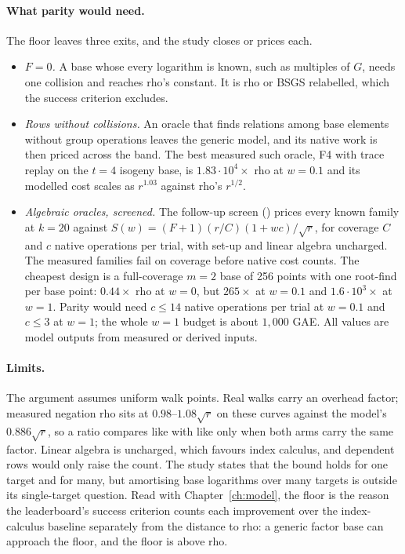 \paragraph{What parity would need.} The floor leaves three exits, and the
study closes or prices each.
\begin{itemize}
\item \emph{$F=0$.} A base whose every logarithm is known, such as
  multiples of $G$, needs one collision and reaches rho's constant. It is
  rho or BSGS relabelled, which the success criterion excludes.
\item \emph{Rows without collisions.} An oracle that finds relations among
  base elements without group operations leaves the generic model, and its
  native work is then priced across the band. The best measured such
  oracle, F4 with trace replay on the $t=4$ isogeny base, is
  $1.83\cdot10^4\times$ rho at $w=0.1$ and its modelled cost scales as
  $r^{1.03}$ against rho's $r^{1/2}$.
\item \emph{Algebraic oracles, screened.} The follow-up screen
  ()
  prices every known family at $k=20$ against
  $S(w)=(F+1)(r/C)(1+wc)/\sqrt r$, for coverage $C$ and $c$ native
  operations per trial, with set-up and linear algebra uncharged. The
  measured families fail on coverage before native cost counts. The
  cheapest design is a full-coverage $m=2$ base of 256 points with one
  root-find per base point: $0.44\times$ rho at $w=0$, but $265\times$ at
  $w=0.1$ and $1.6\cdot10^3\times$ at $w=1$. Parity would need $c\le14$
  native operations per trial at $w=0.1$ and $c\le3$ at $w=1$; the whole
  $w=1$ budget is about $1{,}000$ GAE. All values are model outputs from
  measured or derived inputs.
\end{itemize}

\paragraph{Limits.} The argument assumes uniform walk points. Real walks
carry an overhead factor; measured negation rho sits at $0.98$--$1.08\sqrt r$
on these curves against the model's $0.886\sqrt r$, so a ratio compares
like with like only when both arms carry the same factor. Linear algebra
is uncharged, which favours index calculus, and dependent rows would only
raise the count. The study states that the bound holds for one target and
for many, but amortising base logarithms over many targets is outside its
single-target question. Read with Chapter~\ref{ch:model}, the floor is the
reason the leaderboard's success criterion counts each improvement over
the index-calculus baseline separately from the distance to rho: a generic
factor base can approach the floor, and the floor is above rho.

